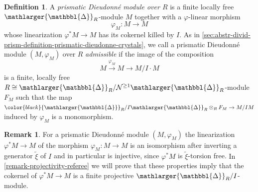 \documentclass{amsart}
\newcommand{\prism}{{\mathlarger{\mathbbl{\Delta}}}}
\theoremstyle{plain}
\theoremstyle{definition}
\newtheorem{definition}[theorem]{Definition}
\newtheorem{remark}[theorem]{Remark}
\newcommand{\tilxi}{\tilde{\xi}}
\newcommand{\red}[1]{{\color{black} #1}}
\newcommand{\olive}[1]{{\color{black}#1}}
\newcommand{\green}[1]{{\color{black}#1}}
\begin{document}
\begin{definition}
  \label{sec:abstr-divid-prism-definition-prismatic-dieudonne-modules-for-quasi-regular semiperfectoid}
  A \textit{prismatic Dieudonn\'e module over $R$} is a finite locally free $\prism_R$-module $M$ together with a $\varphi$-linear morphism
  $$
  \varphi_M \colon M\to M
  $$
  whose linearization \red{$\varphi^\ast M \to M$} has its cokernel killed by $I$. As in \ref{sec:abstr-divid-prism-definition-prismatic-dieudonne-crystals}, we call a prismatic Dieudonn\'e module $(M,\varphi_M)$ over $R$ \textit{admissible} if the image of the composition
  \[
    M\xrightarrow{\varphi_M}M\to M/I\cdot M
  \]
  is a finite, locally free $R\cong \prism_R/\mathcal{N}^{\geq 1}\prism_R$-module $F_M$ such that the map $\green{\prism_R/I\prism_R} \otimes_{R} F_M \to M/IM$ induced by $\varphi_{M}$ is a monomorphism.
\end{definition}

% 

\begin{remark}
\label{remarks-on-the-definition-ofo-prismatic-dieudonne-module}
 For a prismatic Dieudonn\'e module $(M,\varphi_M)$ the linearization \red{$\varphi^\ast M \to M$} of the morphism $\varphi_M\colon M\to M$ is an isomorphism after inverting a generator $\tilde{\xi}$ of $I$ and in particular is injective, since $\varphi^{\ast}M$ is $\tilxi$-torsion free. \green{In \ref{remark-projectivity-referee} we will prove that these properties imply that the cokernel of $\varphi^\ast M\to M$ is a finite projective $\prism_R/I$-module.}
%
%
\end{remark}
\end{document}
